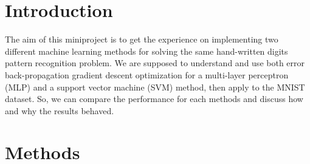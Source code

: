 \section{Introduction}

	The aim of this miniproject is to get the experience on implementing two different machine learning methods for solving the same hand-written digits pattern recognition problem. We are supposed to understand and use both error back-propagation gradient descent optimization for a multi-layer perceptron (MLP) and a support vector machine (SVM) method, then apply to the MNIST dataset. So, we can compare the performance for each methods and discuss how and why the results behaved.

\section{Methods}
